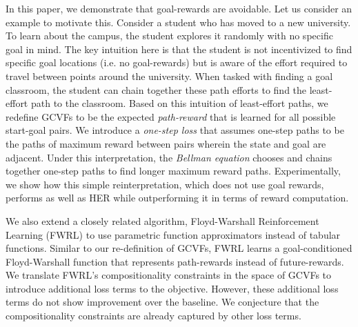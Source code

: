 %
In this paper, we demonstrate that goal-rewards are 
avoidable. Let us consider an example to motivate this. Consider a student who has moved
to a new university. To learn about the campus, the student explores it
randomly with no specific goal in mind. The key intuition here is that
the student is not incentivized to find specific goal locations (i.e.
no goal-rewards) but is aware of the effort required to travel between
points around the university. When tasked with
finding a goal classroom, the student can chain together these
path efforts to find the least-effort path to the
classroom. 
%
Based on this intuition of least-effort paths, we redefine GCVFs to be
the expected \emph{path-reward} that is learned for all possible
start-goal pairs. We  
introduce a \emph{one-step loss} that assumes one-step paths 
to be the paths of maximum reward between pairs wherein the state and goal are adjacent.
Under this interpretation, the \emph{Bellman equation} chooses and chains
together one-step paths to find longer maximum reward paths. 
%
Experimentally, we show how this simple reinterpretation, which does not use goal
rewards, performs as well as HER while outperforming it in terms of
reward computation.

We also extend a closely related algorithm, Floyd-Warshall Reinforcement
Learning (FWRL) \citep{dhiman2018floydwarshall} to use parametric
function approximators instead of tabular functions. Similar to our
re-definition of GCVFs, FWRL learns a goal-conditioned Floyd-Warshall function
that represents path-rewards instead of future-rewards.
We translate FWRL's compositionality constraints in the space of GCVFs to introduce
additional loss terms to the objective. However, these additional loss
terms do not show improvement over the baseline. We conjecture that the
compositionality constraints are already captured by other loss terms. 

